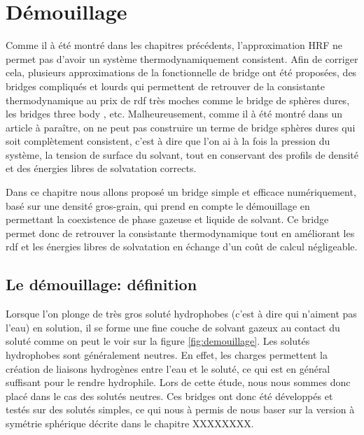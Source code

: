 \chapter{Démouillage}




Comme il à été montré dans les chapitres précédents, l'approximation HRF ne permet pas d'avoir un système thermodynamiquement consistent. Afin de corriger cela, plusieurs approximations de la fonctionnelle de bridge ont été proposées, des bridges compliqués et lourds qui permettent de retrouver de la consistante thermodynamique\cite{jeanmairet_molecular_2015} au prix de rdf très moches comme le bridge de sphères dures\cite{liu_bridge-functional-based_2014,levesque_scalar_2012}, les bridges three body \cite{jeanmairet_molecular_2015}, etc.  Malheureusement, comme il à été montré dans un article à paraître, on ne peut pas construire un terme de bridge sphères dures qui soit complètement consistent, c'est à dire que l'on ai à la fois la pression du système, la tension de surface du solvant, tout en conservant des profils de densité et des énergies libres de solvatation corrects. 

Dans ce chapitre nous allons proposé un bridge simple et efficace numériquement, basé sur une densité gros-grain, qui prend en compte le démouillage en permettant la coexistence de phase gazeuse et liquide de solvant. Ce bridge permet donc de retrouver la consistante thermodynamique tout en améliorant les rdf et les énergies libres de solvatation en échange d'un coût de calcul négligeable.


\section{Le démouillage: définition}
Lorsque l'on plonge de très gros soluté hydrophobes (c'est à dire qui n'aiment pas l'eau) en solution, il se forme une fine couche de solvant gazeux au contact du soluté comme on peut le voir sur la figure \ref{fig:demouillage}. Les solutés hydrophobes sont généralement neutres. En effet, les charges permettent la création de liaisons hydrogènes entre l'eau et le soluté, ce qui est en général suffisant pour le rendre hydrophile. Lors de cette étude, nous nous sommes donc placé dans le cas des solutés neutres. Ces bridges ont donc été développés et testés sur des solutés simples, ce qui nous à permis de nous baser sur la version à symétrie sphérique décrite dans le chapitre XXXXXXXX.

